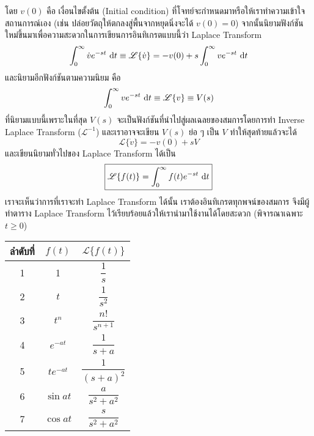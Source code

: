 \documentclass[a4paper,12pt]{article}
\begin{document}
โดย $v(0)$ คือ เงื่อนไขตั้งต้น (Initial condition) ที่โจทย์จะกำหนดมาหรือให้เราทำความเข้าใจสถานการณ์เอง (เช่น ปล่อยวัตถุให้ตกลงสู่พื้นจากหยุดนิ่งจะได้ $v(0)=0$) จากนั้นนิยามฟังก์ชันใหม่ขึ้นมาเพื่อความสะดวกในการเขียนการอินทิเกรตแบบนี้ว่า Laplace Transform
\begin{equation*}
	\int_0^\infty \dot{v}e^{-st}\,\dl t\equiv \mathscr{L}\{\dot{v}\}=-v(0)+s\int_0^\infty ve^{-st}\,\dl t
\end{equation*}
และนิยามอีกฟังก์ชันตามความนิยม คือ
\begin{equation*}
	\int_0^\infty ve^{-st}\,\dl t\equiv \mathscr{L}\{v\}\equiv V(s)
\end{equation*}
ที่นิยามแบบนี้เพราะในที่สุด $V(s)$ จะเป็นฟังก์ชันที่นำไปสู่ผลเฉลยของสมการโดยการทำ Inverse Laplace Transform ($\mathscr{L}^{-1}$) และเราอาจจะเขียน $V(s)$ ย่อ ๆ เป็น $V$ ทำให้สุดท้ายแล้วจะได้
\begin{equation*}
	\mathscr{L}\{\dot{v}\}=-v(0)+sV
\end{equation*}
และเขียนนิยามทั่วไปของ Laplace Transform ได้เป็น
\begin{equation}
	\boxed{
		\mathscr{L}\{f(t)\}=\int_0^\infty f(t)e^{-st}\,\dl t
	}
\end{equation}
เราจะเห็นว่าการที่เราจะทำ Laplace Transform ได้นั้น เราต้องอินทิเกรตทุกพจน์ของสมการ จึงมีผู้ทำตาราง Laplace Transform ไว้เรียบร้อยแล้วให้เรานำมาใช้งานได้โดยสะดวก (พิจารณาเฉพาะ $t\geqslant0$)
\begin{center}
	\bgroup
	\def\arraystretch{2}
	\begin{tabular}{|c|c|c|}
		\hline
		ลำดับที่ & $f(t)$     & $\mathscr{L}\{f(t)\}$ \\
		\hline
		1     & 1          & $\dfrac{1}{s}$        \\
		\hline
		2     & $t$        & $\dfrac{1}{s^2}$      \\
		\hline
		3     & $t^n$      & $\dfrac{n!}{s^{n+1}}$ \\
		\hline
		4     & $e^{-at}$  & $\dfrac{1}{s+a}$      \\
		\hline
		5     & $te^{-at}$ & $\dfrac{1}{(s+a)^2}$  \\
		\hline
		6     & $\sin at$  & $\dfrac{a}{s^2+a^2}$  \\
		\hline
		7     & $\cos at$  & $\dfrac{s}{s^2+a^2}$  \\
		\hline
	\end{tabular}
	\egroup
\end{center}
\end{document}
